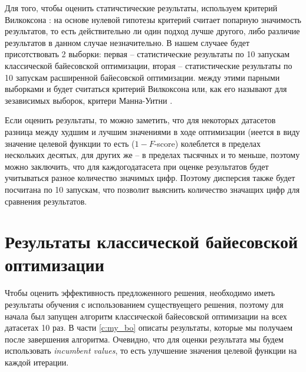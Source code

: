 \documentclass[times,specification,annotation]{itmo-student-thesis}
\begin{document}
	Для того, чтобы оценить статичстические результаты, используем критерий Вилкоксона \cite{Neuhäuser2011}:  \label{df:cox} на основе нулевой гипотезы критерий считает попарную значимость результатов, то есть действительно ли один подход лучше другого, либо различие результатов в данном случае незначительно. В нашем случаее будет присотствовать 2 выборки: первая -- статистические результаты по 10 запускам классической байесовской оптимизации, вторая --  статистические результаты по 10 запускам расширенной байесовской оптимизации. между этими парными выборками и будет считаться критерий Вилкоксона или, как его называют для зезависимых выборок, критери Манна-Уитни \cite{mann1947}. 
	\par 
	
	Если оценить результаты, то можно заметить, что для некоторых датасетов разница между худшим и лучшим значениями в ходе оптимизации (иеется в виду значение целевой функции то есть ($ 1 - F $-score) колеблется в пределах нескольких десятых, для других же -- в пределах тысячных и то меньше, поэтому можно заключить, что для каждогодатасета при оценке результатов будет учитываться разное количество значимых цифр. Поэтому дисперсия также будет посчитана по 10 запускам,  что позволит выяснить количество значащих цифр для сравнения результатов.
	\section{Результаты классической байесовской оптимизации} \label{s:bo-res}
	Чтобы оценить эффективность предложенного решения, необходимо иметь результаты обучения с использованием существуещего решения, поэтому для начала был запущен алгоритм классической байесовской оптимизации на всех датасетах 10 раз. В части \ref{c:my_bo} описаты результаты, которые мы получаем после завершения алгоритма. Очевидно, что для оценки результата мы будем использовать \textit{incumbent values}, то есть улучшение значения целевой функции на каждой итерации. \par 
	
\end{document}
